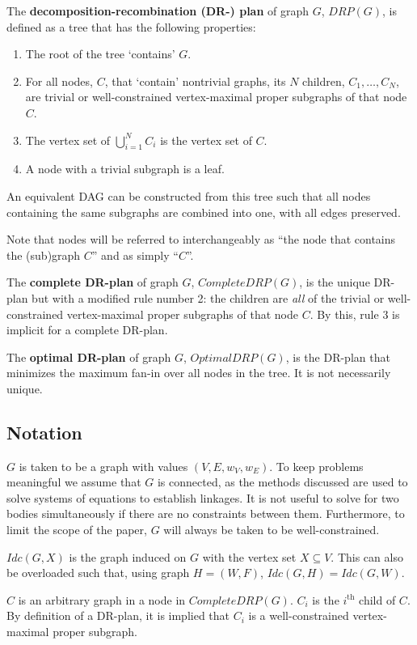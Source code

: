 The \textbf{decomposition-recombination (DR-) plan} of graph $G$, $DRP(G)$, is defined as a tree that has the following properties:
\begin{enumerate}
    \item The root of the tree `contains' $G$.
    \item For all nodes, $C$, that `contain' nontrivial graphs, its $N$ children, $C_1, \ldots, C_N$, are trivial or well-constrained vertex-maximal proper subgraphs of that node $C$.
    \item The vertex set of $\bigcup_{i=1}^N{C_i}$ is the vertex set of $C$.
    \item A node with a trivial subgraph is a leaf.
\end{enumerate}

An equivalent DAG can be constructed from this tree such that all nodes containing the same subgraphs are combined into one, with all edges preserved.

Note that nodes will be referred to interchangeably as ``the node that contains the (sub)graph $C$'' and as simply ``$C$''.

The \textbf{complete DR-plan} of graph $G$, $CompleteDRP(G)$, is the unique DR-plan but with a modified rule number 2: the children are \textit{all} of the trivial or well-constrained vertex-maximal proper subgraphs of that node $C$. By this, rule 3 is implicit for a complete DR-plan.

The \textbf{optimal DR-plan} of graph $G$, $OptimalDRP(G)$, is the DR-plan that minimizes the maximum fan-in over all nodes in the tree. It is not necessarily unique.


\subsection{Notation}

$G$ is taken to be a graph with values $(V,E,w_V,w_E)$. To keep problems meaningful we assume that $G$ is connected, as the methods discussed are used to solve systems of equations to establish linkages. It is not useful to solve for two bodies simultaneously if there are no constraints between them. Furthermore, to limit the scope of the paper, $G$ will always be taken to be well-constrained.

$Idc(G,X)$ is the graph induced on $G$ with the vertex set $X\subseteq V$. This can also be overloaded such that, using graph $H=(W,F)$, $Idc(G,H)=Idc(G,W)$.

$C$ is an arbitrary graph in a node in $CompleteDRP(G)$. $C_i$ is the $i^{\text{th}}$ child of $C$. By definition of a DR-plan, it is implied that $C_i$ is a well-constrained vertex-maximal proper subgraph.
